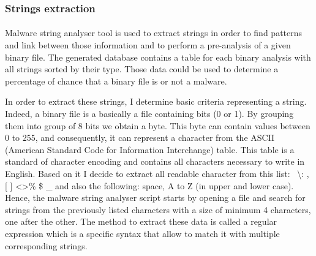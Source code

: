 \subsubsection{Strings extraction} %

\paragraph{}

Malware string analyser tool is used to extract strings in order to find patterns and link 
between those information and to perform a pre-analysis of a given binary file.
The generated database contains a table for each binary analysis with all strings sorted
by their type. Those data could be used to determine a percentage of chance that
a binary file is or not a malware.

In order to extract these strings, I determine basic criteria representing a string. Indeed,
a binary file is a basically a file containing bits (0 or 1). By grouping them into group of
8 bits we obtain a byte. This byte can contain values between 0 to 255, and consequently, it
can represent a character from the ASCII (American Standard Code for Information Interchange)
table. This table is a standard of character encoding and contains all characters necessary
to write in English. Based on it I decide to extract all readable character from this
list: \ \textbackslash : , [ ] \textless \textgreater \% \$ \_  and also the following: space, A to Z (in upper and lower case).
Hence, the malware string analyser script starts by opening a file and search for strings from 
the previously listed characters with a size of minimum 4 characters, one after the other.
The method to extract these data is called a regular expression which is a specific syntax 
that allow to match it with multiple corresponding strings.

